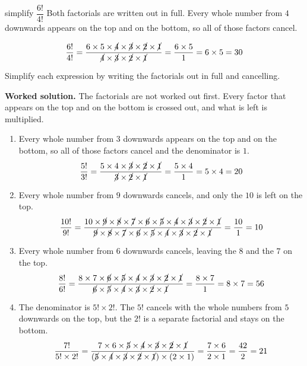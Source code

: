 \documentclass[12pt,a4paper]{article}
\newcommand{\qhead}[2]{\par\addvspace{9pt}%
  \noindent{\bfseries Q#1.}\enspace #2\par\nobreak}
\newcommand{\wsol}{\par\smallskip
  \noindent\textbf{\color{blue!50!black}Worked solution.}\space}
\begin{document}
\begin{wex}{simplify $\dfrac{6!}{4!}$}
\small
Both factorials are written out in full. Every whole number from $4$ downwards
appears on the top and on the bottom, so all of those factors cancel.

\smallskip
\[\frac{6!}{4!}
  =\frac{6\times5\times\cancel{4}\times\cancel{3}\times\cancel{2}\times\cancel{1}}
   {\cancel{4}\times\cancel{3}\times\cancel{2}\times\cancel{1}}
  =\frac{6\times5}{1}=6\times5=30\]
\end{wex}

\qhead{11}{Simplify each expression by writing the factorials out in full and
cancelling.}
\wsol
The factorials are not worked out first. Every factor that appears on the top
and on the bottom is crossed out, and what is left is multiplied.

\begin{enumerate}
\item Every whole number from $3$ downwards appears on the top and on the
bottom, so all of those factors cancel and the denominator is $1$.
\[\frac{5!}{3!}
  =\frac{5\times4\times\cancel{3}\times\cancel{2}\times\cancel{1}}
   {\cancel{3}\times\cancel{2}\times\cancel{1}}
  =\frac{5\times4}{1}=5\times4=20\]

\item Every whole number from $9$ downwards cancels, and only the $10$ is left
on the top.
\[\frac{10!}{9!}
  =\frac{10\times\cancel{9}\times\cancel{8}\times\cancel{7}\times\cancel{6}
   \times\cancel{5}\times\cancel{4}\times\cancel{3}\times\cancel{2}
   \times\cancel{1}}
   {\cancel{9}\times\cancel{8}\times\cancel{7}\times\cancel{6}\times\cancel{5}
   \times\cancel{4}\times\cancel{3}\times\cancel{2}\times\cancel{1}}
  =\frac{10}{1}=10\]

\item Every whole number from $6$ downwards cancels, leaving the $8$ and the
$7$ on the top.
\[\frac{8!}{6!}
  =\frac{8\times7\times\cancel{6}\times\cancel{5}\times\cancel{4}
   \times\cancel{3}\times\cancel{2}\times\cancel{1}}
   {\cancel{6}\times\cancel{5}\times\cancel{4}\times\cancel{3}\times\cancel{2}
   \times\cancel{1}}=\frac{8\times7}{1}=8\times7=56\]

\item The denominator is $5!\times2!$. The $5!$ cancels with the whole numbers
from $5$ downwards on the top, but the $2!$ is a separate factorial and stays
on the bottom.
\[\frac{7!}{5!\times2!}
  =\frac{7\times6\times\cancel{5}\times\cancel{4}\times\cancel{3}
   \times\cancel{2}\times\cancel{1}}
   {(\cancel{5}\times\cancel{4}\times\cancel{3}\times\cancel{2}\times\cancel{1})
   \times(2\times1)}
  =\frac{7\times6}{2\times1}=\frac{42}{2}=21\]


\end{enumerate}
\end{document}
